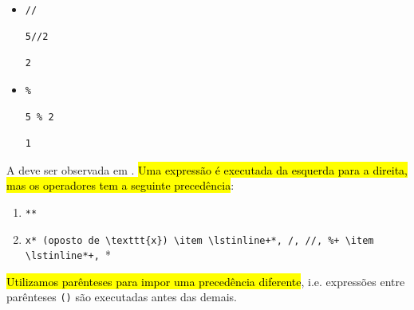 \begin{itemize}
\item \lstinline+//+ 

\begin{lstlisting}[xrightmargin=2.5em]
5//2
\end{lstlisting}

\begin{verbatim}
2
\end{verbatim}

\item \texttt{\%} 

\begin{lstlisting}[xrightmargin=2.5em]
5 % 2
\end{lstlisting}

\begin{verbatim}
1
\end{verbatim}

\end{itemize}

A  deve ser observada em {\python}. \hl{Uma expressão é executada da esquerda para a direita, mas os operadores tem a seguinte precedência}:

\begin{enumerate}
\item \lstinline+**+
\item \lstinline*-x* (oposto de \texttt{x})
\item \lstinline+*, /, //, %+
\item \lstinline*+, -*
\end{enumerate}

\hl{Utilizamos parênteses para impor uma precedência diferente}, i.e. expressões entre parênteses \texttt{()} são executadas antes das demais.

